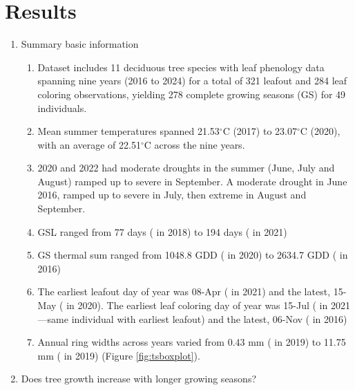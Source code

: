 \documentclass{article}\usepackage[]{graphicx}\usepackage[]{xcolor}
\begin{document}
\section*{Results}
\begin{enumerate}
\item Summary basic information
  \begin{enumerate}

  \item Dataset includes 11 deciduous tree species with leaf phenology data spanning nine years (2016 to 2024) for a total of 
  321 leafout and 
  284 leaf coloring
   observations, yielding 
  278 complete growing seasons (GS) for 
  49 individuals. 
  
  \item Mean summer temperatures spanned 
  21.53$^\circ$C 
  (2017) to 
  23.07$^\circ$C 
  (2020), with an average of
  22.51$^\circ$C across the nine years.

  \item 2020 and 2022 had moderate droughts in the summer (June, July and August) ramped up to severe in September. A moderate drought in June 2016, ramped up to severe in July, then extreme in August and September. 
  
  \item GSL ranged from 
  77 days ({\Afla} in 
  2018) to 
  194 days ({\Asac} in 
  2021)

  \item GS thermal sum ranged from 
  1048.8 GDD ({\Afla} in 
  2020) to 
  2634.7 GDD ({\Tame} in 
  2016)
  
  \item The earliest leafout day of year was 
  08-Apr ({\Afla} in 
  2021) and the latest, 
  15-May ({\Cova} in 
  2020). The earliest leaf coloring day of year was
  15-Jul ({\Afla} in 
  2021---same individual with earliest leafout) and the latest, 
  06-Nov ({\Tame} in
  2016) 
  
  \item Annual ring widths across years varied from 
  0.43 mm ({\Asac} in 2019) to 
  11.75 mm ({\Tame} in 2019) (Figure \ref{fig:tsboxplot}).
 
\end{enumerate}
\item Does tree growth increase with longer growing seasons?
  \begin{enumerate}


\end{enumerate}
\end{enumerate}
\end{document}
